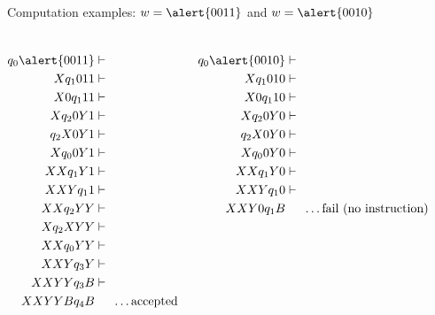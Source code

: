 \documentclass[handout]{beamer}
\begin{document}
\begin{frame}{Computation examples: $w=\alert{0011}$ and $w=\alert{0010}$}
    
    \small

    \begin{columns}


        \vspace{-0.75cm}
        \begin{align*}
            q_0\alert{0011}&\vdash\\
            Xq_1011&\vdash\\
            X0q_111&\vdash\\
            Xq_20Y1&\vdash\\
            q_2X0Y1&\vdash\\
            Xq_00Y1&\vdash\\
            XXq_1Y1&\vdash\\    
            XXYq_11&\vdash\\
            XXq_2YY&\vdash\\
            Xq_2XYY&\vdash\\
            XXq_0YY&\vdash\\
            XXYq_3Y&\vdash\\
            XXYYq_3B&\vdash\\
            XXYYBq_4B&\phantom{\vdash}\quad\text{\dots accepted}
        \end{align*}
      
        
        \vspace{-3.7cm}
        \begin{align*}
            q_0\alert{0010}&\vdash\\
            Xq_1010&\vdash\\
            X0q_110&\vdash\\
            Xq_20Y0&\vdash\\
            q_2X0Y0&\vdash\\
            Xq_00Y0&\vdash\\
            XXq_1Y0&\vdash\\
            XXYq_10&\vdash\\
            XXY0q_1B&\phantom{\vdash}\quad\text{\dots fail (no instruction)}
        \end{align*}
        
    \end{columns}

\end{frame}
\end{document}
